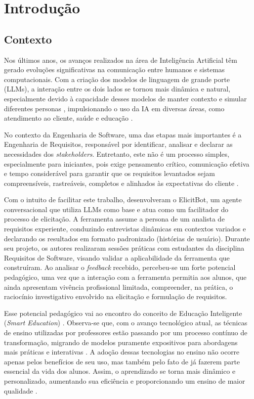 \chapter{Introdução}
\label{cap:introducao}

\section{Contexto}

Nos últimos anos, os avanços realizados na área de Inteligência Artificial têm gerado evoluções significativas na comunicação entre humanos e sistemas computacionais. Com a criação dos modelos de linguagem de grande porte (LLMs), a interação entre os dois lados se tornou mais dinâmica e natural, especialmente devido à capacidade desses modelos de manter contexto e simular diferentes personas \cite{junior2025}, impulsionando o uso da IA em diversas áreas, como atendimento ao cliente, saúde e educação \cite{adamopoulou2020, almogren2024}.

No contexto da Engenharia de Software, uma das etapas mais importantes é a Engenharia de Requisitos, responsável por identificar, analisar e declarar as necessidades dos \textit{stakeholders}. Entretanto, este não é um processo simples, especialmente para iniciantes, pois exige pensamento crítico, comunicação efetiva e tempo considerável para garantir que os requisitos levantados sejam compreensíveis, rastreáveis, completos e alinhados às expectativas do cliente \cite{sommerville2016}.

Com o intuito de facilitar este trabalho,  desenvolveram o ElicitBot, um agente conversacional que utiliza LLMs como base e atua como um facilitador do processo de elicitação. A ferramenta assume a persona de um analista de requisitos experiente, conduzindo entrevistas dinâmicas em contextos variados e declarando os resultados em formato padronizado (histórias de usuário). Durante seu projeto, os autores realizaram sessões práticas com estudantes da disciplina Requisitos de Software, visando validar a aplicabilidade da ferramenta que construíram. Ao analisar o \textit{feedback} recebido, percebeu-se um forte potencial pedagógico, uma vez que a interação com a ferramenta permitia aos alunos, que ainda apresentam vivência profissional limitada, compreender, na prática, o raciocínio investigativo envolvido na elicitação e formulação de requisitos.

Esse potencial pedagógico vai ao encontro do conceito de Educação Inteligente (\textit{Smart Education}) \cite{zhu2016}. Observa-se que, com o avanço tecnológico atual, as técnicas de ensino utilizadas por professores estão passando por um processo contínuo de transformação, migrando de modelos puramente expositivos para abordagens mais práticas e interativas \cite{lin2024, almogren2024}. A adoção dessas tecnologias no ensino não ocorre apenas pelos benefícios de seu uso, mas também pelo fato de já fazerem parte essencial da vida dos alunos. Assim, o aprendizado se torna mais dinâmico e personalizado, aumentando sua eficiência e proporcionando um ensino de maior qualidade \cite{zhu2016, almogren2024}.

